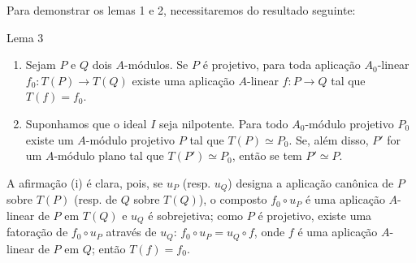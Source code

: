 Para demonstrar os lemas 1 e 2, necessitaremos do resultado seguinte:

\begin{statement}{Lema 3}
\begin{enumerate}[label=(\roman*)]
\item Sejam $P$ e $Q$ dois $A$-módulos. Se $P$ é projetivo, para toda aplicação $A_0$-linear $f_0:T(P)\to T(Q)$ existe uma aplicação $A$-linear $f:P\to Q$ tal que $T(f)=f_0$.
\item Suponhamos que o ideal $I$ seja nilpotente. Para todo $A_0$-módulo projetivo $P_0$ existe um $A$-módulo projetivo $P$ tal que $T(P)\simeq P_0$. Se, além disso, $P'$ for um $A$-módulo plano tal que $T(P')\simeq P_0$, então se tem $P'\simeq P$.
\end{enumerate}
\end{statement}

A afirmação (i) é clara, pois, se $u_P$ (resp. $u_Q$) designa a aplicação canônica de $P$ sobre $T(P)$ (resp. de $Q$ sobre $T(Q)$), o composto $f_0\circ u_P$ é uma aplicação $A$-linear de $P$ em $T(Q)$ e $u_Q$ é sobrejetiva; como $P$ é projetivo, existe uma fatoração de $f_0\circ u_P$ através de $u_Q$: $f_0\circ u_P=u_Q\circ f$, onde $f$ é uma aplicação $A$-linear de $P$ em $Q$; então $T(f)=f_0$.
